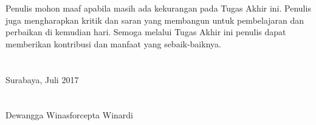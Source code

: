 Penulis mohon maaf apabila masih ada kekurangan pada Tugas Akhir ini. Penulis juga mengharapkan kritik dan saran yang membangun untuk pembelajaran dan perbaikan di kemudian hari. Semoga melalui Tugas Akhir ini penulis dapat memberikan kontribusi dan manfaat yang sebaik-baiknya. \\ \\ \\

\hfill Surabaya, Juli 2017 \\ \\ \\

\hfill Dewangga Winasforcepta Winardi \\
\cleardoublepage

